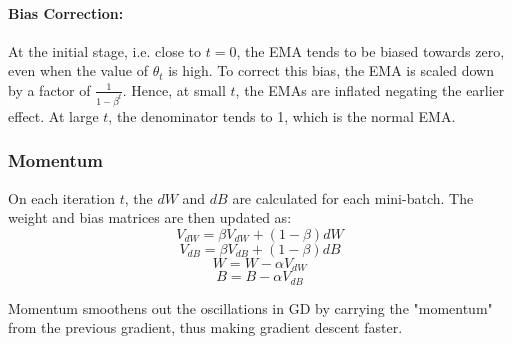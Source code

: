 \documentclass[12pt]{article}
\begin{document}
\paragraph{Bias Correction: }At the initial stage, i.e. close to $t=0$, the EMA tends to be biased towards zero, even when the value of $\theta_t$ is high. To correct this bias, the EMA is scaled down by a factor of $\frac{1}{1-\beta^t}$. Hence, at small $t$, the EMAs are inflated negating the earlier effect. At large $t$, the denominator tends to 1, which is the normal EMA.\\

\subsubsection*{Momentum}
On each iteration $t$, the $dW$ and $dB$ are calculated for each mini-batch. The weight and bias matrices are then updated as:
\begin{equation}
    V_{dW} = \beta V_{dW} + (1-\beta) dW
\end{equation}
\begin{equation}
    V_{dB} = \beta V_{dB} + (1-\beta) dB
\end{equation}
\begin{equation}
    W = W - \alpha V_{dW}
\end{equation}
\begin{equation}
    B = B - \alpha V_{dB}
\end{equation}

Momentum smoothens out the oscillations in GD by carrying the "momentum" from the previous gradient, thus making gradient descent faster.\\
\end{document}
